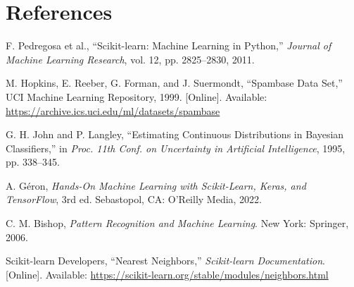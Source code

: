 \documentclass[11pt,a4paper]{article}
\begin{document}
\section{References}
\begin{enumerate}[label={[\arabic*]}]
\item F. Pedregosa et al., ``Scikit-learn: Machine Learning in Python,'' \emph{Journal of Machine Learning Research}, vol. 12, pp. 2825--2830, 2011.
\item M. Hopkins, E. Reeber, G. Forman, and J. Suermondt, ``Spambase Data Set,'' UCI Machine Learning Repository, 1999. [Online]. Available: \url{https://archive.ics.uci.edu/ml/datasets/spambase}
\item G. H. John and P. Langley, ``Estimating Continuous Distributions in Bayesian Classifiers,'' in \emph{Proc. 11th Conf. on Uncertainty in Artificial Intelligence}, 1995, pp. 338--345.
\item A. G\'eron, \emph{Hands-On Machine Learning with Scikit-Learn, Keras, and TensorFlow}, 3rd ed. Sebastopol, CA: O'Reilly Media, 2022.
\item C. M. Bishop, \emph{Pattern Recognition and Machine Learning}. New York: Springer, 2006.
\item Scikit-learn Developers, ``Nearest Neighbors,'' \emph{Scikit-learn Documentation}. [Online]. Available: \url{https://scikit-learn.org/stable/modules/neighbors.html}
\end{enumerate}
\end{document}
